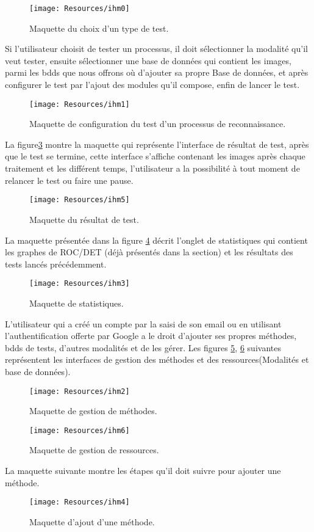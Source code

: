 \begin{figure}[H]
	\centering
	\texttt{[image: Resources/ihm0]}
	\caption{Maquette du choix d'un type de test. }
	\label{ihm0}
\end{figure}
Si l'utilisateur choisit de tester un processus, il doit sélectionner la modalité qu'il veut tester, ensuite sélectionner une base de données qui contient les images, parmi les bdds que nous offrons où d'ajouter sa propre Base de données, et après configurer le test par l'ajout des modules qu'il compose, enfin de lancer le test.

\begin{figure}[H]
	\centering
	\texttt{[image: Resources/ihm1]}
	\caption{Maquette de configuration du test d'un processus de reconnaissance. }
	\label{ihm4}
\end{figure}
La figure\ref{ihm5} montre la maquette qui représente l'interface de résultat de test, après que le test se termine, cette interface s’affiche contenant les images après chaque traitement et les différent temps, l'utilisateur a la possibilité à tout moment de relancer le test ou faire une pause. 

\begin{figure}[H]
	\centering
	\texttt{[image: Resources/ihm5]}
	\caption{Maquette du résultat de test. }
	\label{ihm5}
\end{figure}

La maquette présentée dans la figure \ref{ihm3} décrit l'onglet de statistiques qui contient les graphes de ROC/DET (déjà présentés dans la section) et les résultats des tests lancés précédemment.

\begin{figure}[H]
	\centering
	\texttt{[image: Resources/ihm3]}
	\caption{Maquette de statistiques. }
	\label{ihm3}
\end{figure}

L'utilisateur qui a créé un compte par la saisi de son email ou en utilisant l'authentification offerte par Google a le droit d'ajouter ses propres méthodes, bdds de tests, d'autres modalités et de les gérer. Les figures \ref{ihm1}, \ref{ihm6} suivantes représentent les interfaces de gestion des méthodes et des ressources(Modalités et base de données).  


\begin{figure}[H]
	\centering
	\texttt{[image: Resources/ihm2]}
	\caption{Maquette de gestion de méthodes. }
	\label{ihm1}
\end{figure}
\begin{figure}[H]
	\centering
	\texttt{[image: Resources/ihm6]}
	\caption{Maquette de gestion de ressources. }
	\label{ihm6}
\end{figure}
La maquette suivante montre les étapes qu'il doit suivre pour ajouter une méthode.
\begin{figure}[H]
	\centering
	\texttt{[image: Resources/ihm4]}
	\caption{Maquette d'ajout d'une méthode. }
	\label{ihm2}
\end{figure}
